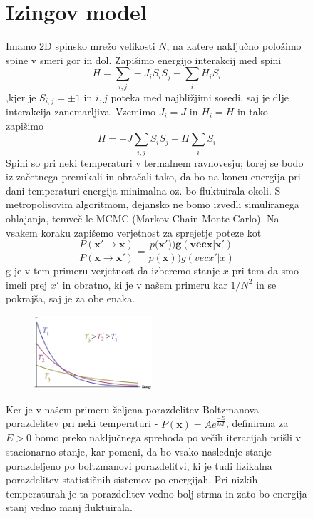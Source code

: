 \documentclass[11pt, a4paper]{article}
\renewcommand{\vec}[1]{\mathbf{#1}}
\begin{document}
\begin{figure}[H]
\section{Izingov model}
Imamo 2D spinsko mrežo velikosti $N$, na katere naključno položimo spine v smeri gor in dol. Zapišimo energijo interakcij med spini
\begin{equation}
H = \sum_{i,j} -J_i S_i S_j - \sum_i H_i S_i 
\end{equation}
,kjer je $S_{i,j} = \pm 1$ in $i,j$ poteka med najbližjimi sosedi, saj je dlje interakcija zanemarljiva. Vzemimo $J_i = J$ in $H_i = H$ in tako zapišimo 
\begin{equation}
H =-J \sum_{i,j}  S_i S_j -H \sum_i  S_i 
\end{equation}
Spini so pri neki temperaturi v termalnem ravnovesju; torej se bodo iz začetnega premikali in obračali tako, da bo na koncu energija pri dani temperaturi energija minimalna oz. bo fluktuirala okoli.
\newline\newline
S metropolisovim algoritmom, dejansko ne bomo izvedli simuliranega ohlajanja, temveč le MCMC (Markov Chain Monte Carlo). Na vsakem koraku zapišemo verjetnost za sprejetje poteze kot 
\begin{equation}
 \frac{P(\vec{x'} \rightarrow \vec{x})} {P(\vec{x} \rightarrow \vec{x'})} = \frac{p(\vec{x')) g(vec{x}|x')}}{p(\vec{x})) g(vec{x'}|x)}
\end{equation}
g je v tem primeru verjetnost da izberemo stanje $x$ pri tem da smo imeli prej $x'$ in obratno, ki je v našem primeru kar $1 / N^2$ in se pokrajša, saj je za obe enaka. \newline\newline
\begin{figure}
  \begin{center}
    \includegraphics[width=0.48\textwidth]{Boltzmann.png}
  \end{center}
  \caption{}

\end{figure}
\newline\newline
Ker je v našem primeru željena porazdelitev Boltzmanova porazdelitev pri neki temperaturi - $P(\vec{x}) = Ae^{\frac{-E}{k_bT}}$, definirana za $E>0$ bomo preko naključnega sprehoda po večih iteracijah prišli v stacionarno stanje, kar pomeni, da bo vsako naslednje stanje porazdeljeno po boltzmanovi porazdelitvi, ki je tudi fizikalna porazdelitev statističnih sistemov po energijah. Pri nizkih temperaturah je ta porazdelitev vedno bolj strma in zato bo energija stanj vedno manj fluktuirala.
\newline\newline


\end{figure}
\end{document}
